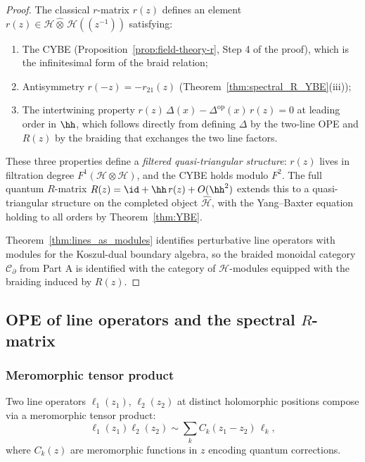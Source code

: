 \begin{proof}
The classical $r$-matrix $r(z)$ defines an element $r(z) \in \mathcal{H} \widehat{\otimes}\, \mathcal{H}((z^{-1}))$ satisfying:
\begin{enumerate}[label=(\alph*)]
\item The CYBE (Proposition~\ref{prop:field-theory-r}, Step 4 of the proof), which is the infinitesimal form of the braid relation;
\item Antisymmetry $r(-z) = -r_{21}(z)$ (Theorem~\ref{thm:spectral_R_YBE}(iii));
\item The intertwining property $r(z)\,\Delta(x) - \Delta^{\mathrm{op}}(x)\,r(z) = 0$ at leading order in $\hh$, which follows directly from defining $\Delta$ by the two-line OPE and $R(z)$ by the braiding that exchanges the two line factors.
\end{enumerate}
These three properties define a \emph{filtered quasi-triangular structure}: $r(z)$ lives in filtration degree $F^1(\mathcal{H} \otimes \mathcal{H})$, and the CYBE holds modulo $F^2$. The full quantum $R$-matrix $R(z) = \id + \hh\, r(z) + O(\hh^2)$ extends this to a quasi-triangular structure on the completed object $\widehat{\mathcal{H}}$, with the Yang--Baxter equation holding to all orders by Theorem~\ref{thm:YBE}.

Theorem~\ref{thm:lines_as_modules} identifies perturbative line operators with modules for the Koszul-dual boundary algebra, so the braided monoidal category $\mathcal{C}_\partial$ from Part A is identified with the category of $\mathcal{H}$-modules equipped with the braiding induced by $R(z)$.
\end{proof}

\subsection{OPE of line operators and the spectral $R$-matrix}

\subsubsection{Meromorphic tensor product}

Two line operators $\ell_1(z_1)$, $\ell_2(z_2)$ at distinct holomorphic positions compose via a meromorphic tensor product:
\begin{equation}
\ell_1(z_1) \ell_2(z_2) \sim \sum_k C_k(z_1 - z_2) \, \ell_k,
\end{equation}
where $C_k(z)$ are meromorphic functions in $z$ encoding quantum corrections.

